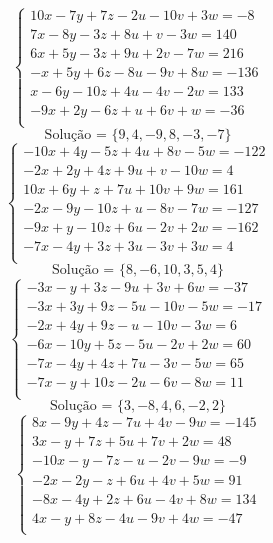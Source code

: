 \documentclass[12pt,oneside,a4paper]{article}
\begin{document}
\vspace{\baselineskip}
\begin{equation*}
\begin{cases}
10x-7y+7z-2u-10v+3w=-8 \\
7x-8y-3z+8u+v-3w=140 \\
6x+5y-3z+9u+2v-7w=216 \\
-x+5y+6z-8u-9v+8w=-136 \\
x-6y-10z+4u-4v-2w=133 \\
-9x+2y-6z+u+6v+w=-36 \\
\end{cases}
\end{equation*}
\begin{equation*}
\text{Solução = }\{9,4,-9,8,-3,-7\}
\end{equation*}
\vspace{\baselineskip}
\begin{equation*}
\begin{cases}
-10x+4y-5z+4u+8v-5w=-122 \\
-2x+2y+4z+9u+v-10w=4 \\
10x+6y+z+7u+10v+9w=161 \\
-2x-9y-10z+u-8v-7w=-127 \\
-9x+y-10z+6u-2v+2w=-162 \\
-7x-4y+3z+3u-3v+3w=4 \\
\end{cases}
\end{equation*}
\begin{equation*}
\text{Solução = }\{8,-6,10,3,5,4\}
\end{equation*}
\vspace{\baselineskip}
\begin{equation*}
\begin{cases}
-3x-y+3z-9u+3v+6w=-37 \\
-3x+3y+9z-5u-10v-5w=-17 \\
-2x+4y+9z-u-10v-3w=6 \\
-6x-10y+5z-5u-2v+2w=60 \\
-7x-4y+4z+7u-3v-5w=65 \\
-7x-y+10z-2u-6v-8w=11 \\
\end{cases}
\end{equation*}
\begin{equation*}
\text{Solução = }\{3,-8,4,6,-2,2\}
\end{equation*}
\vspace{\baselineskip}
\begin{equation*}
\begin{cases}
8x-9y+4z-7u+4v-9w=-145 \\
3x-y+7z+5u+7v+2w=48 \\
-10x-y-7z-u-2v-9w=-9 \\
-2x-2y-z+6u+4v+5w=91 \\
-8x-4y+2z+6u-4v+8w=134 \\
4x-y+8z-4u-9v+4w=-47 \\
\end{cases}
\end{equation*}
\end{document}
